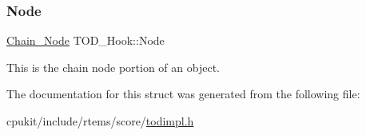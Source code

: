 \subsubsection{\texorpdfstring{Node}{Node}}
{\footnotesize\ttfamily \mbox{\hyperlink{group__RTEMSScoreChain_ga0dd4bfcca1ac7f90de2842e447846d3d}{Chain\+\_\+\+Node}} T\+O\+D\+\_\+\+Hook\+::\+Node}

This is the chain node portion of an object. 

The documentation for this struct was generated from the following file\+:\begin{DoxyCompactItemize}
\item 
cpukit/include/rtems/score/\mbox{\hyperlink{todimpl_8h}{todimpl.\+h}}\end{DoxyCompactItemize}

